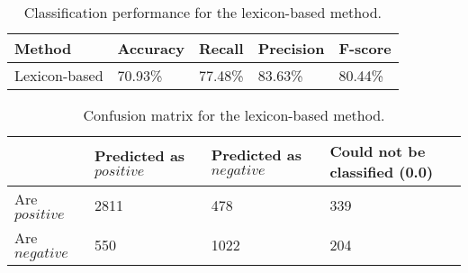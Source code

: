 \begin{table}
\caption{Classification performance for the lexicon-based method.}
\label{tab:eval_lex}
\centering
\begin{tabular}{ |p{2cm}||p{2cm}|p{2cm}|p{2cm}|p{2cm}|}
 \hline
 Method &          Accuracy &      Recall &     Precision& F-score \\
  \hline
 Lexicon-based & 70.93\% & 77.48\% & 83.63\% & 80.44\% \\
 \hline
 \end{tabular}
 
\end{table}
\begin{table}[]
\centering
\caption{Confusion matrix for the lexicon-based method.}
\begin{tabular}{ |p{3cm}||p{3cm}|p{3cm}|p{3cm}| }
 \hline
  &          Predicted as $positive$ &Predicted as $negative$  & Could not be classified (0.0)\\
 \hline
 Are $positive$        & 2811&            478 & 339\\
  \hline
 Are $negative$  &550&                     1022 & 204\\
 \hline

\end{tabular}
\label{tab:evaluations_conf_lex}
\end{table}



